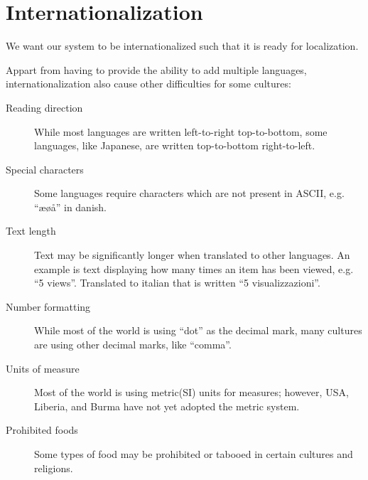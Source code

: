\section{Internationalization}
We want our system to be internationalized such that it is ready for localization.

Appart from having to provide the ability to add multiple languages, internationalization also cause other difficulties for some cultures:

\begin{description}
  \item[Reading direction] While most languages are written left-to-right top-to-bottom, some languages, like Japanese, are written top-to-bottom right-to-left.
  \item[Special characters] Some languages require characters which are not present in ASCII, e.g. ``æøå'' in danish.
  \item[Text length] Text may be significantly longer when translated to other languages. An example is text displaying how many times an item has been viewed, e.g. ``5 views''. Translated to italian that is written ``5 visualizzazioni''.\cite{wordlength}
  \item[Number formatting] While most of the world is using ``dot'' as the decimal mark, many cultures are using other decimal marks, like ``comma''.
  \item[Units of measure] Most of the world is using metric(SI) units for measures; however, USA, Liberia, and Burma have not yet adopted the metric system.\cite{unitsfactbook}
  \item[Prohibited foods] Some types of food may be prohibited or tabooed in certain cultures and religions.
\end{description}